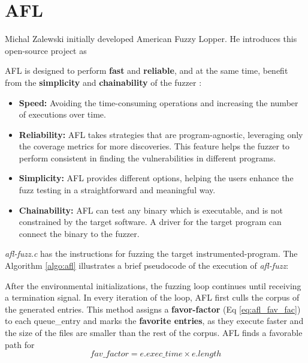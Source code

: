 \section{AFL} \label{sec:2.3}

Michal Zalewski initially developed American Fuzzy Lopper. He introduces this open-source project as  \cite{zalewski2014american}

AFL is designed to perform \textbf{fast} and \textbf{reliable}, and at the same time, benefit from the \textbf{simplicity} and \textbf{chainability} of the fuzzer \cite{about_afl}:

\begin{itemize}
    \item \textbf{Speed:} Avoiding the time-consuming operations and increasing the number of executions over time.
    \item \textbf{Reliability:} AFL takes strategies that are program-agnostic, leveraging only the coverage metrics for more discoveries. This feature helps the fuzzer to perform consistent in finding the vulnerabilities in different programs.
    \item \textbf{Simplicity:} AFL provides different options, helping the users enhance the fuzz testing in a straightforward and meaningful way. 
    \item \textbf{Chainability:} AFL can test any binary which is executable, and is not constrained by the target software. A driver for the target program can connect the binary to the fuzzer.
\end{itemize}

\textit{afl-fuzz.c} has the instructions for fuzzing the target instrumented-program. The Algorithm \ref{algo:afl} illustrates a brief pseudocode of the execution of \textit{afl-fuzz}:



After the environmental initializations, the fuzzing loop continues until receiving a termination signal. In every iteration of the loop, AFL first culls the corpus of the generated entries. This method assigns a \textbf{favor-factor} (Eq \ref{eq:afl_fav_fac}) to each queue\_entry and marks the \textbf{favorite entries}, as they execute faster and the size of the files are smaller than the rest of the corpus. AFL finds a favorable path for  \cite{afl_git} 
\begin{equation}
    fav\_factor = e.exec\_time \times e.length
    \label{eq:afl_fav_fac}
\end{equation}

